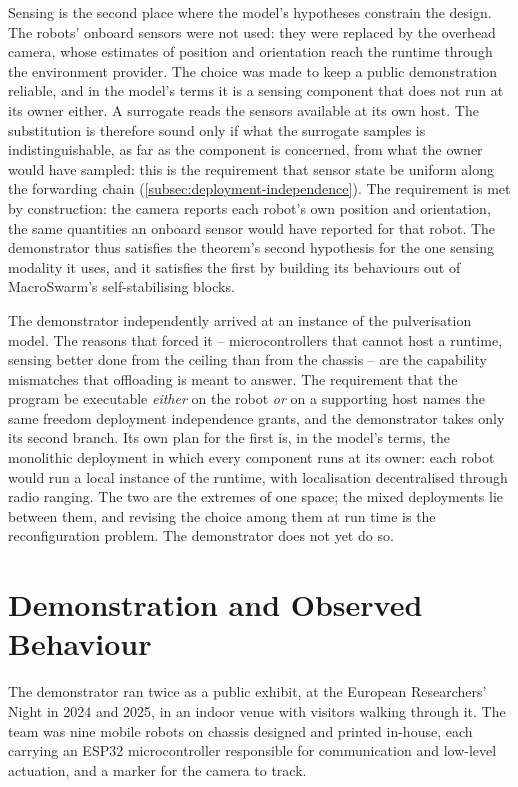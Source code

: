 Sensing is the second place where the model's hypotheses constrain the design.
%
The robots' onboard sensors were not used:
they were replaced by the overhead camera, whose estimates of position and orientation reach the runtime through the environment provider.
%
The choice was made to keep a public demonstration reliable,
and in the model's terms it is a sensing component that does not run at its owner either.
%
A surrogate reads the sensors available at its own host.
The substitution is therefore sound only if what the surrogate samples is indistinguishable, as far as the component is concerned, from what the owner would have sampled:
this is the requirement that sensor state be uniform along the forwarding chain (\cref{subsec:deployment-independence}).
%
The requirement is met by construction:
the camera reports each robot's own position and orientation, the same quantities an onboard sensor would have reported for that robot.
%
The demonstrator thus satisfies the theorem's second hypothesis for the one sensing modality it uses,
and it satisfies the first by building its behaviours out of MacroSwarm's self-stabilising blocks.

The demonstrator independently arrived at an instance of the pulverisation model.
The reasons that forced it -- microcontrollers that cannot host a runtime, sensing better done from the ceiling than from the chassis --
are the capability mismatches that offloading is meant to answer.
%
The requirement that the program be executable \emph{either} on the robot \emph{or} on a supporting host
names the same freedom deployment independence grants, and the demonstrator takes only its second branch.
%
Its own plan for the first is, in the model's terms, the monolithic deployment in which every component runs at its owner:
each robot would run a local instance of the runtime, with localisation decentralised through radio ranging.
%
The two are the extremes of one space; the mixed deployments lie between them,
and revising the choice among them at run time is the reconfiguration problem.
The demonstrator does not yet do so.

\section{Demonstration and Observed Behaviour}
\label{sec:emerge-demonstration}

The demonstrator ran twice as a public exhibit, at the European Researchers' Night in 2024 and 2025,
in an indoor venue with visitors walking through it.
%
The team was nine mobile robots on chassis designed and printed in-house,
each carrying an ESP32 microcontroller responsible for communication and low-level actuation, and a marker for the camera to track.

